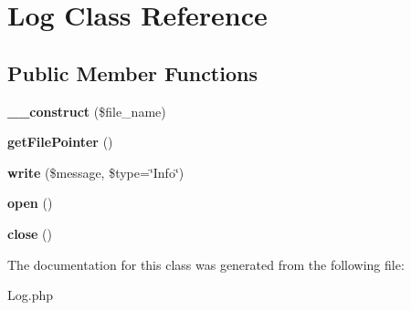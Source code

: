 \hypertarget{class_log}{}\section{Log Class Reference}
\label{class_log}
\subsection*{Public Member Functions}
\begin{DoxyCompactItemize}
\item 
\mbox{\label{class_log_a424ff9c7cdfbda288905fbac7e20b6ba}} 
{\bfseries \+\_\+\+\_\+construct} (\$file\+\_\+name)
\item 
\mbox{\label{class_log_a920308bfd90102618703af4393ccab7c}} 
{\bfseries get\+File\+Pointer} ()
\item 
\mbox{\label{class_log_a1176b92f0b0e4b3a40514af0dbc55169}} 
{\bfseries write} (\$message, \$type=\char`\"{}Info\char`\"{})
\item 
\mbox{\label{class_log_a44a2ac59a3b91f8c18905dce700934d6}} 
{\bfseries open} ()
\item 
\mbox{\label{class_log_aa69c8bf1f1dcf4e72552efff1fe3e87e}} 
{\bfseries close} ()
\end{DoxyCompactItemize}


The documentation for this class was generated from the following file\+:\begin{DoxyCompactItemize}
\item 
Log.\+php\end{DoxyCompactItemize}
